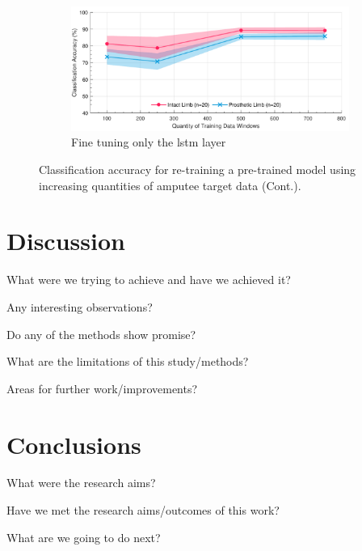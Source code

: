 \begin{figure}[t]\ContinuedFloat
    \centering
    \begin{subfigure}{\textwidth}
        \includegraphics[width=\textwidth]{content/6-Amputee/ch6_frozen_dense_layer_accuracy.pdf}
        \caption{Fine tuning only the \acrshort{lstm} layer}
    \end{subfigure}
    \caption[]{Classification accuracy for re-training a pre-trained model using increasing quantities of amputee target data (Cont.).}
\end{figure}


\section{Discussion}
\label{sec:amputee-discussion}
What were we trying to achieve and have we achieved it?

Any interesting observations?

Do any of the methods show promise?


What are the limitations of this study/methods?

Areas for further work/improvements?
\section{Conclusions}
\label{sec:amputee-conclusions}
What were the research aims?

Have we met the research aims/outcomes of this work?

What are we going to do next?